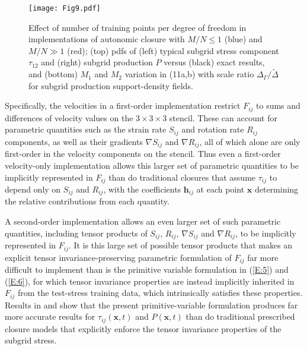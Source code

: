 %
\begin{figure}
	\begin{center}
	\texttt{[image: Fig9.pdf]}
	\caption{Effect of number of training points per degree of freedom in implementations of autonomic closure with $M/N \leq 1$ (blue) and $M/N \gg 1$  (red); (top) pdfs of (left) typical subgrid stress component $\tau_{12}$ and (right) subgrid production $P$ versus (black) exact results, and (bottom) $M_1$ and $M_2$ variation in (11a,b) with scale ratio $\Delta_{\Gamma}/\widetilde{\Delta}$ for subgrid production support-density fields.}
	\label{F:9}
	\end{center}
\end{figure}
%
%

Specifically, the velocities in a first-order implementation restrict  $F_{ij}$ to sums and differences of velocity values on the $3 \times 3 \times 3$  stencil. These can account for parametric quantities such as the strain rate $S_{ij}$  and rotation rate  $R_{ij}$ components, as well as their gradients $\nabla S_{ij}$  and $\nabla R_{ij}$, all of which alone are only first-order in the velocity components on the stencil. Thus even a first-order velocity-only implementation allows this larger set of parametric quantities to be implicitly represented in $F_{ij}$  than do traditional closures that assume $\tau_{ij}$  to depend only on $S_{ij}$  and $R_{ij}$, with the coefficients $\mathbf{h}_{ij}$  at each point $\mathbf{x}$ determining the relative contributions from each quantity. 

A second-order implementation allows an even larger set of such parametric quantities, including tensor products of $S_{ij}$, $R_{ij}$,  $\nabla S_{ij}$ and $\nabla R_{ij}$, to be implicitly represented in $F_{ij}$. It is this large set of possible tensor products that makes an explicit tensor invariance-preserving parametric formulation of  $F_{ij}$ far more difficult to implement than is the primitive variable formulation in (\ref{E:5}) and (\ref{E:6}), for which tensor invariance properties are instead implicitly inherited in $F_{ij}$  from the test-stress training data, which intrinsically satisfies these properties. Results in  and  show that the present primitive-variable formulation produces far more accurate results for  $\tau_{ij}(\mathbf{x},t)$ and $P(\mathbf{x},t)$  than do traditional prescribed closure models that explicitly enforce the tensor invariance properties of the subgrid stress.

